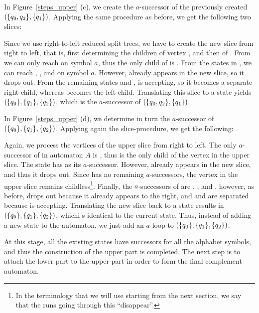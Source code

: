 In Figure~\ref{steps_upper} (c), we create the $a$-successor of the previously created $(\{q_{0},q_{2}\}, \{q_{1}\})$. Applying the same procedure as before, we get the following two slices:

\begin{center}
\SlicesTwo
\end{center}

Since we use right-to-left reduced split trees, we have to create the new slice from right to left, that is, first determining the children of vertex , and then of . From  we can only reach  on symbol $a$, thus the only child of  is . From the states in , we can reach , , and  on symbol $a$. However,  already appears in the new slice, so it drops out. From the remaining states  and ,  is accepting, so it becomes a separate right-child, whereas  becomes the left-child. Translating this slice to a state yields $(\{q_{0}\}, \{q_{1}\}, \{q_{2}\})$, which is the $a$-successor of $(\{q_{0},q_{2}\}, \{q_{1}\})$.

In Figure~\ref{steps_upper} (d), we determine in turn the $a$-successor of $(\{q_{0}\}, \{q_{1}\}, \{q_{2}\})$. Applying again the slice-procedure, we get the following:

\begin{center}
\SlicesThree
\end{center}

Again, we process the vertices of the upper slice from right to left. The only $a$-successor of  in automaton $A$ is , thus  is the only child of the vertex  in the upper slice. The state  has  as its $a$-successor. However,  already appears in the new slice, and thus it drops out. Since  has no remaining $a$-successors, the vertex  in the upper slice remains childless\footnote{In the terminology that we will use starting from the next section, we say that the runs going through this  ``disappear''.}. Finally, the $a$-successors of  are , , and , however, as before,  drops out because it already appears to the right, and  and  are separated because  is accepting. Translating the new slice back to a state results in $(\{q_{0}\}, \{q_{1}\}, \{q_{2}\})$, whichi s identical to the current state. Thus, instead of adding a new state to the automaton, we just add an $a$-loop to $(\{q_{0}\}, \{q_{1}\}, \{q_{2}\})$.

At this stage, all the existing states have successors for all the alphabet symbols, and thus the construction of the upper part is completed. The next step is to attach the lower part to the upper part in order to form the final complement automaton.



